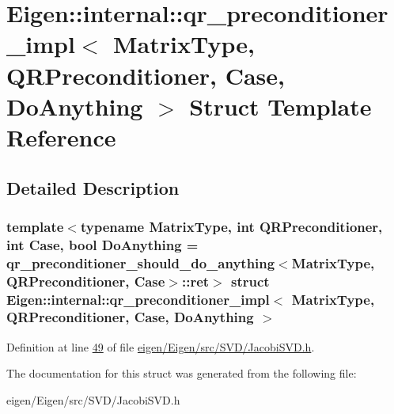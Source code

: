 \hypertarget{struct_eigen_1_1internal_1_1qr__preconditioner__impl}{}\section{Eigen\+:\+:internal\+:\+:qr\+\_\+preconditioner\+\_\+impl$<$ Matrix\+Type, Q\+R\+Preconditioner, Case, Do\+Anything $>$ Struct Template Reference}
\label{struct_eigen_1_1internal_1_1qr__preconditioner__impl}


\subsection{Detailed Description}
\subsubsection*{template$<$typename Matrix\+Type, int Q\+R\+Preconditioner, int Case, bool Do\+Anything = qr\+\_\+preconditioner\+\_\+should\+\_\+do\+\_\+anything$<$\+Matrix\+Type, Q\+R\+Preconditioner, Case$>$\+::ret$>$\newline
struct Eigen\+::internal\+::qr\+\_\+preconditioner\+\_\+impl$<$ Matrix\+Type, Q\+R\+Preconditioner, Case, Do\+Anything $>$}



Definition at line \hyperlink{eigen_2_eigen_2src_2_s_v_d_2_jacobi_s_v_d_8h_source_l00049}{49} of file \hyperlink{eigen_2_eigen_2src_2_s_v_d_2_jacobi_s_v_d_8h_source}{eigen/\+Eigen/src/\+S\+V\+D/\+Jacobi\+S\+V\+D.\+h}.



The documentation for this struct was generated from the following file\+:\begin{DoxyCompactItemize}
\item 
eigen/\+Eigen/src/\+S\+V\+D/\+Jacobi\+S\+V\+D.\+h\end{DoxyCompactItemize}
